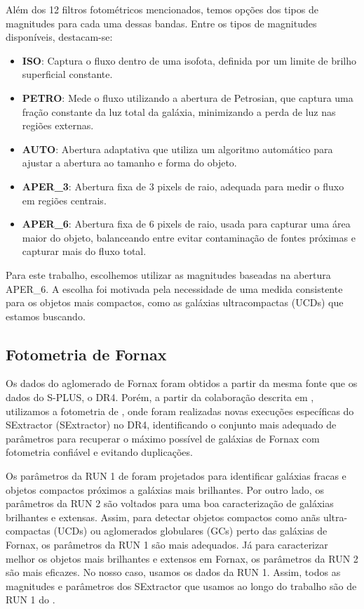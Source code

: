 Além dos 12 filtros fotométricos mencionados, temos opções dos tipos de magnitudes para cada uma dessas bandas. Entre os tipos de magnitudes disponíveis, destacam-se:

\begin{itemize}
    \item \textbf{ISO}: Captura o fluxo dentro de uma isofota, definida por um limite de brilho superficial constante.
    \item \textbf{PETRO}: Mede o fluxo utilizando a abertura de Petrosian, que captura uma fração constante da luz total da galáxia, minimizando a perda de luz nas regiões externas.
    \item \textbf{AUTO}: Abertura adaptativa que utiliza um algoritmo automático para ajustar a abertura ao tamanho e forma do objeto.
    \item \textbf{APER\_3}: Abertura fixa de 3 pixels de raio, adequada para medir o fluxo em regiões centrais.
    \item \textbf{APER\_6}: Abertura fixa de 6 pixels de raio, usada para capturar uma área maior do objeto, balanceando entre evitar contaminação de fontes próximas e capturar mais do fluxo total.
\end{itemize}

Para este trabalho, escolhemos utilizar as magnitudes baseadas na abertura APER\_6. A escolha foi motivada pela necessidade de uma medida consistente para os objetos mais compactos, como as galáxias ultracompactas (UCDs) que estamos buscando.


\subsection{Fotometria de Fornax}\label{sec:Fornax_data}
Os dados do aglomerado de Fornax foram obtidos a partir da mesma fonte que os dados do S-PLUS, o DR4. Porém, a partir da colaboração descrita em \cite{castelli2024splusfornaxprojectsfp}, utilizamos a fotometria de \cite{haack2024splusfornaxprojectsfp}, onde foram realizadas novas execuções específicas do \ac{SExtractor} (SExtractor) no DR4, identificando o conjunto mais adequado de parâmetros para recuperar o máximo possível de galáxias de Fornax com fotometria confiável e evitando duplicações.

Os parâmetros da RUN 1 de \cite{haack2024splusfornaxprojectsfp} foram projetados para identificar galáxias fracas e objetos compactos próximos a galáxias mais brilhantes. Por outro lado, os parâmetros da RUN 2 são voltados para uma boa caracterização de galáxias brilhantes e extensas. Assim, para detectar objetos compactos como anãs ultra-compactas (UCDs) ou aglomerados globulares (GCs) perto das galáxias de Fornax, os parâmetros da RUN 1 são mais adequados. Já para caracterizar melhor os objetos mais brilhantes e extensos em Fornax, os parâmetros da RUN 2 são mais eficazes. No nosso caso, usamos os dados da RUN 1. Assim, todos as magnitudes e parâmetros dos \ac{SExtractor} que usamos ao longo do trabalho são de RUN 1 do \cite{haack2024splusfornaxprojectsfp}.


